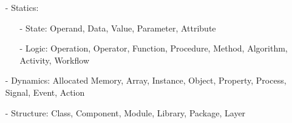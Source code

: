 \begin{itemize}
    \item[-] Statics:
    \begin{itemize}
        \item[-] State: Operand, Data, Value, Parameter, Attribute
        \item[-] Logic: Operation, Operator, Function, Procedure, Method,
            Algorithm, Activity, Workflow
    \end{itemize}
    \item[-] Dynamics: Allocated Memory, Array, Instance, Object, Property,
        Process, Signal, Event, Action
    \item[-] Structure: Class, Component, Module, Library, Package, Layer
\end{itemize}







%

